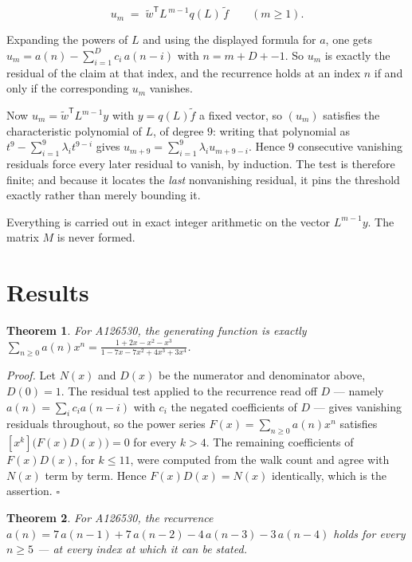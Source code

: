 \documentclass[11pt]{article}
\newtheorem{theorem}{Theorem}
\theoremstyle{definition}
\begin{document}
\[u_m \;=\; \tilde w^{\mathsf T} L^{\,m-1} q(L)\,\tilde f \qquad (m \ge 1).\]

Expanding the powers of $L$ and using the displayed formula for $a$, one gets $u_m = a(n) - \sum_{i=1}^{D} c_i\,a(n-i)$ with $n = m + D + -1$. So $u_m$ is exactly the residual of the claim at that index, and the recurrence holds at an index $n$ if and only if the corresponding $u_m$ vanishes.

Now $u_m = \tilde w^{\mathsf T} L^{m-1} y$ with $y = q(L)\tilde f$ a fixed vector, so $(u_m)$ satisfies the characteristic polynomial of $L$, of degree $9$: writing that polynomial as $t^{9} - \sum_{i=1}^{9} \lambda_i t^{9-i}$ gives $u_{m+9} = \sum_{i=1}^{9} \lambda_i u_{m+9-i}$. Hence $9$ consecutive vanishing residuals force every later residual to vanish, by induction. The test is therefore finite; and because it locates the {\itshape last} nonvanishing residual, it pins the threshold exactly rather than merely bounding it.

Everything is carried out in exact integer arithmetic on the vector $L^{m-1}y$. The matrix $M$ is never formed.

\section{Results}

\begin{theorem} For A126530, the generating function is exactly $\sum_{n\ge 0} a(n)x^n = \frac{1 + 2x - x^{2} - x^{3}}{1 - 7x - 7x^{2} + 4x^{3} + 3x^{4}}$.\end{theorem}

{\itshape Proof.} Let $N(x)$ and $D(x)$ be the numerator and denominator above, $D(0)=1$. The residual test applied to the recurrence read off $D$ --- namely $a(n) = \sum_i c_i a(n-i)$ with $c_i$ the negated coefficients of $D$ --- gives vanishing residuals throughout, so the power series $F(x)=\sum_{n\ge 0}a(n)x^n$ satisfies $[x^k]\bigl(F(x)D(x)\bigr) = 0$ for every $k > 4$. The remaining coefficients of $F(x)D(x)$, for $k \le 11$, were computed from the walk count and agree with $N(x)$ term by term. Hence $F(x)D(x) = N(x)$ identically, which is the assertion. $\square$

\begin{theorem} For A126530, the recurrence $a(n) = 7\,a(n-1) + 7\,a(n-2) - 4\,a(n-3) - 3\,a(n-4)$ holds for every $n \ge 5$ --- at every index at which it can be stated.\end{theorem}
\end{document}
